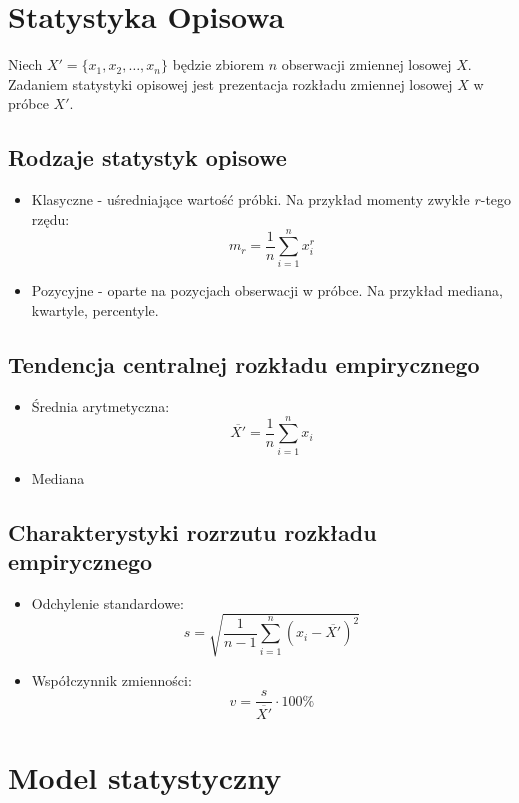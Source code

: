 \documentclass{../notatki}
\begin{document}
\section{Statystyka Opisowa}

Niech $X' = \{x_1, x_2, \ldots, x_n\}$ będzie zbiorem $n$ obserwacji zmiennej
losowej $X$. Zadaniem statystyki opisowej jest prezentacja rozkładu zmiennej
losowej $X$ w próbce $X'$.

\subsection{Rodzaje statystyk opisowe}

\begin{itemize}
  \item Klasyczne - uśredniające wartość próbki. Na przykład momenty
    zwykłe $r$-tego rzędu:
    $$
    m_r = \frac{1}{n} \sum_{i=1}^n x_i^r
    $$
  \item Pozycyjne - oparte na pozycjach obserwacji w próbce. Na przykład
    mediana, kwartyle, percentyle.
\end{itemize}

\subsection{Tendencja centralnej rozkładu empirycznego}

\begin{itemize}
  \item Średnia arytmetyczna:
    $$
    \overline{X'} = \frac{1}{n} \sum_{i=1}^n x_i
    $$
  \item Mediana
\end{itemize}

\subsection{Charakterystyki rozrzutu rozkładu empirycznego}

\begin{itemize}
  \item Odchylenie standardowe:
    $$
    s = \sqrt{\frac{1}{n - 1} \sum_{i=1}^n (x_i - \overline{X'})^2}
    $$
  \item Współczynnik zmienności:
    $$
    v = \frac{s}{\overline{X'}} \cdot 100\%
    $$
\end{itemize}

\section{Model statystyczny}
\end{document}
